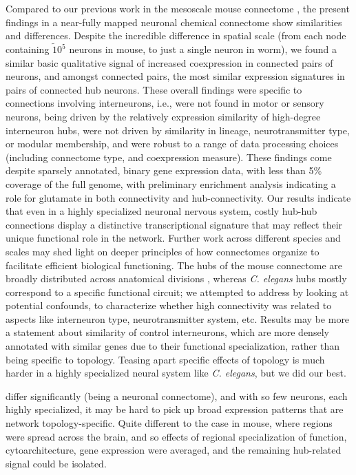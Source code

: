 \documentclass[10pt,letterpaper]{article}
\begin{document}
Compared to our previous work in the mesoscale mouse connectome \cite{Fulcher:2016ck}, the present findings in a near-fully mapped neuronal chemical connectome show similarities and differences.
Despite the incredible difference in spatial scale (from each node containing $\tilde 10^5$ neurons in mouse, to just a single neuron in worm), we found a similar basic qualitative signal of increased coexpression in connected pairs of neurons, and amongst connected pairs, the most similar expression signatures in pairs of connected hub neurons.
These overall findings were specific to connections involving interneurons, i.e., were not found in motor or sensory neurons, being driven by the relatively expression similarity of high-degree interneuron hubs, were not driven by similarity in lineage, neurotransmitter type, or modular membership, and were robust to a range of data processing choices (including connectome type, and coexpression measure).
These findings come despite sparsely annotated, binary gene expression data, with less than 5\% coverage of the full genome, with preliminary enrichment analysis indicating a role for glutamate in both connectivity and hub-connectivity.
Our results indicate that even in a highly specialized neuronal nervous system, costly hub-hub connections display a distinctive transcriptional signature that may reflect their unique functional role in the network.
Further work across different species and scales may shed light on deeper principles of how connectomes organize to facilitate efficient biological functioning.
The hubs of the mouse connectome are broadly distributed across anatomical divisions \cite{Fulcher:2016ck}, whereas \emph{C. elegans} hubs mostly correspond to a specific functional circuit; we attempted to address by looking at potential confounds, to characterize whether high connectivity was related to aspects like interneuron type, neurotransmitter system, etc.
Results may be more a statement about similarity of control interneurons, which are more densely annotated with similar genes due to their functional specialization, rather than being specific to topology.
Teasing apart specific effects of topology is much harder in a highly specialized neural system like \emph{C. elegans}, but we did our best.



differ significantly (being a neuronal connectome), and with so few neurons, each highly specialized, it may be hard to pick up broad expression patterns that are network topology-specific.
Quite different to the case in mouse, where regions were spread across the brain, and so effects of regional specialization of function, cytoarchitecture, gene expression were averaged, and the remaining hub-related signal could be isolated.
\end{document}
